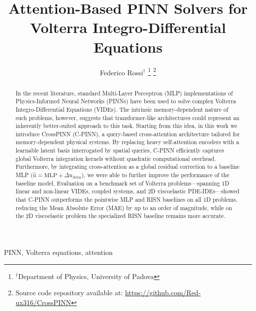 \documentclass[10pt, conference, letterpaper]{IEEEtran}
\title{Attention-Based PINN Solvers for Volterra Integro-Differential Equations}
\author{Federico Rossi$^\dag$
\thanks{$^\dag$Department of Physics, University of Padova}
\thanks{Source code repository available at: \url{https://github.com/Red-ux316/CrossPINN}}
}
\begin{document}
\maketitle

\begin{abstract}

In the recent literature, standard Multi-Layer Perceptron (MLP) implementations of Physics-Informed Neural Networks (PINNs) have been used to solve complex Volterra Integro-Differential Equations (VIDEs). The intrinsic memory-dependent nature of such problems, however, suggests that transformer-like architectures could represent an inherently better-suited approach to this task. 
Starting from this idea, in this work we introduce CrossPINN (C-PINN), a query-based cross-attention architecture tailored for memory-dependent physical systems. By replacing heavy self-attention encoders with a learnable latent basis interrogated by spatial queries, C-PINN efficiently captures global Volterra integration kernels without quadratic computational overhead. 
Furthermore, by integrating cross-attention as a global residual correction to a baseline MLP ($\hat{u} = \text{MLP} + \Delta u_{\text{Attn}}$), we were able to further improve the performance of the baseline model. Evaluation on a benchmark set of Volterra problems—spanning 1D linear and non-linear VIDEs, coupled systems, and 2D viscoelastic PDE-IDEs—showed that C-PINN outperforms the pointwise MLP and RISN baselines on all 1D problems, reducing the Mean Absolute Error (MAE) by up to an order of magnitude, while on the 2D viscoelastic problem the specialized RISN baseline remains more accurate.
\end{abstract}

\IEEEkeywords
PINN, Volterra equations, attention 
\endIEEEkeywords








%











\end{document}
